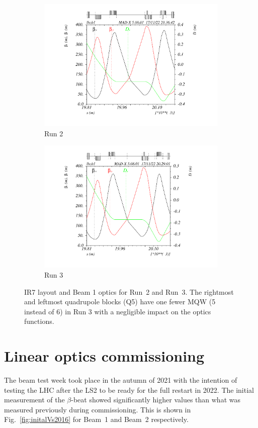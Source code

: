 \documentclass[a4paper]{cernatsnote}
\begin{document}
\begin{figure}
\begin{subfigure}{1.\textwidth}
  \centering
  \includegraphics[width=0.76\linewidth, trim=85 45 70 15, clip]{plots/beam1/IR7_Run2.pdf}  
  \caption{Run 2}
\end{subfigure}
\begin{subfigure}{1.\textwidth}
  \centering
  \includegraphics[width=.83\linewidth, trim=65 45 70 15, clip]{plots/beam1/IR7_Run3.pdf}  
  \caption{Run 3}
\end{subfigure}
\caption{IR7 layout and Beam 1 optics for Run~2 and Run~3. The rightmost  and leftmost quadrupole blocks (Q5) have one fewer MQW (5 instead of 6) in Run 3 with a negligible impact on the optics functions.}
\label{fig:IR7}
\end{figure}


\section{Linear optics commissioning}
The beam test week took place in the autumn of 2021 with the intention of testing the LHC after the LS2 to be ready for the full restart in 2022.
The initial measurement of the $\beta$-beat showed significantly higher values than what was measured previously during commissioning. This is shown in Fig.~\ref{fig:initalVs2016} for Beam~1 and Beam~2 respectively.  
\end{document}
